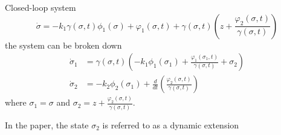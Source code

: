 Closed-loop system
      \begin{equation}
         \dot{\sigma} = -k_1\gamma(\sigma, t)\phi_1(\sigma) + \varphi_1(\sigma, t) + \gamma(\sigma, t)\left(z + \frac{\varphi_2(\sigma, t)}{\gamma(\sigma, t)}\right)
      \end{equation}
      the system can be broken down
      \begin{equation}
         \begin{split}
            \dot{\sigma}_1 &= \gamma(\sigma, t)\left(-k_1\phi_1(\sigma_1) + \frac{\varphi_1(\sigma_1,t)}{\gamma(\sigma, t)} + \sigma_2\right)\\
            \dot{\sigma}_2 &= -k_2\phi_2(\sigma_1)+ \frac{d}{dt}\left(\frac{\varphi_2(\sigma, t)}{\gamma(\sigma, t)}\right)
         \end{split}
      \end{equation}
      where $\sigma_1 = \sigma$ and $\sigma_2 = z + \frac{\varphi_2(\sigma, t)}{\gamma(\sigma, t)}$. 
      \begin{rmk}
        In the paper, the state $\sigma_2$ is referred to as a dynamic extension
      \end{rmk}

